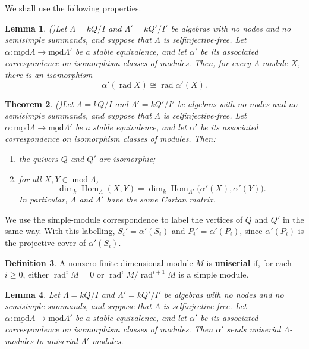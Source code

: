 \documentclass[11pt]{article}
\newcommand{\rad}{\operatorname{rad}}
\newcommand{\Hom}{\operatorname{Hom}}
\renewcommand{\mod}{\operatorname{mod}}
\newcommand{\smod}{\operatorname{\underline{mod}}}
\providecommand{\varLambda}{\Lambda}
\newtheorem{theorem}{Theorem}[section]
\newtheorem{lemma}[theorem]{Lemma}
\theoremstyle{definition}
\newtheorem{definition}[theorem]{Definition}
\begin{document}
		We shall use the following properties. 

		\begin{lemma}\textnormal{(\cite[Lemma~3.3]{Mar90})}\label{Mar90 lemma 3.3}
			Let $\varLambda=kQ/I$ and $\varLambda'=kQ'/I'$ be algebras with no nodes and no semisimple summands, and suppose that $\varLambda$ is selfinjective-free.
			Let $\alpha:\smod\varLambda\to\smod\varLambda'$ be a stable equivalence, and let $\alpha'$ be its associated correspondence on isomorphism classes of modules.
			Then, for every $\varLambda$-module $X$, there is an isomorphism
			\[
				\alpha'(\rad X)\cong\rad\alpha'(X).
			\]
		\end{lemma}

		\begin{theorem}\textnormal{(\cite[Theorem~3.4]{Mar90})}\label{Mar90 thm 3.4}
			Let $\varLambda=kQ/I$ and $\varLambda'=kQ'/I'$ be algebras with no nodes and no semisimple summands, and suppose that $\varLambda$ is selfinjective-free.
			Let $\alpha:\smod\varLambda\to\smod\varLambda'$ be a stable equivalence, and let $\alpha'$ be its associated correspondence on isomorphism classes of modules.
			Then:
			\begin{enumerate}
				\item[(a)] the quivers $Q$ and $Q'$ are isomorphic;
				\item[(b)] for all $X,Y\in\mod\varLambda$,
				\[
					\dim_k\Hom_{\varLambda}(X,Y)
					=\dim_k\Hom_{\varLambda'}\bigl(\alpha'(X),\alpha'(Y)\bigr).
				\]
				In particular, $\varLambda$ and $\varLambda'$ have the same Cartan matrix.
			\end{enumerate}
		\end{theorem}

		We use the simple-module correspondence to label the vertices of $Q$ and $Q'$ in the same way.
		With this labelling, $S_i'=\alpha'(S_i)$ and $P_i'=\alpha'(P_i)$, since $\alpha'(P_i)$ is the projective cover of $\alpha'(S_i)$.

		\begin{definition}\label{def of uniserial modules}
			A nonzero finite-dimensional module $M$ is \textbf{uniserial} if, for each $i\geq0$, either $\rad^iM=0$ or $\rad^iM/\rad^{i+1}M$ is a simple module.
		\end{definition}

		\begin{lemma}\label{lemma of sending uniserial modules}
			Let $\varLambda=kQ/I$ and $\varLambda'=kQ'/I'$ be algebras with no nodes and no semisimple summands, and suppose that $\varLambda$ is selfinjective-free.
			Let $\alpha:\smod\varLambda\to\smod\varLambda'$ be a stable equivalence, and let $\alpha'$ be its associated correspondence on isomorphism classes of modules.
			Then $\alpha'$ sends uniserial $\varLambda$-modules to uniserial $\varLambda'$-modules.
		\end{lemma}
\end{document}
